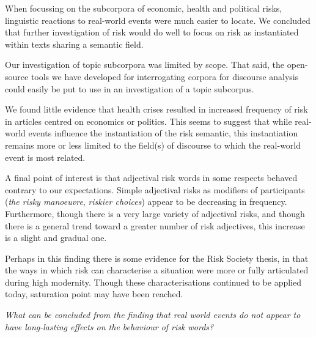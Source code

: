 	When focussing on the subcorpora of economic, health and political risks, linguistic reactions to real-world events were much easier to locate. We concluded that further investigation of risk would do well to focus on risk as instantiated within texts sharing a semantic field. 

            Our investigation of topic subcorpora was limited by scope. That said, the open-source tools we have developed for interrogating corpora for discourse analysis could easily be put to use in an investigation of a topic subcorpus.

	
	We found little evidence that health crises resulted in increased frequency of risk in articles centred on economics or politics. This seems to suggest that while real-world events influence the instantiation of the risk semantic, this instantiation remains more or less limited to the field(s) of discourse to which the real-world event is most related.

	A final point of interest is that adjectival risk words in some respects behaved contrary to our expectations. Simple adjectival risks as modifiers of participants (\emph{the risky manoeuvre}, \emph{riskier choices}) appear to be decreasing in frequency. Furthermore, though there is a very large variety of adjectival risks, and though there is a general trend toward a greater number of risk adjectives, this increase is a slight and gradual one.

	Perhaps in this finding there is some evidence for the Risk Society thesis, in that the ways in which risk can characterise a situation were more or fully articulated during high modernity. Though these characterisations continued to be applied today, saturation point may have been reached.

    \emph{What can be concluded from the finding that real world events do not appear to have long-lasting effects on the behaviour of risk words?}

